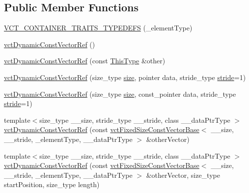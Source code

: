 \subsection*{Public Member Functions}
\begin{DoxyCompactItemize}
\item 
\hyperlink{classvct_dynamic_const_vector_ref_af5a1af086a71a1b9192b759c5d307390}{V\-C\-T\-\_\-\-C\-O\-N\-T\-A\-I\-N\-E\-R\-\_\-\-T\-R\-A\-I\-T\-S\-\_\-\-T\-Y\-P\-E\-D\-E\-F\-S} (\-\_\-element\-Type)
\item 
\hyperlink{classvct_dynamic_const_vector_ref_a6a664d6feac7f6b9ec7e6102a8752383}{vct\-Dynamic\-Const\-Vector\-Ref} ()
\item 
\hyperlink{classvct_dynamic_const_vector_ref_a9404543cc8b25da05266c6c58298cf02}{vct\-Dynamic\-Const\-Vector\-Ref} (const \hyperlink{classvct_dynamic_const_vector_ref_a8da0588e2e355e6224badfd42845195e}{This\-Type} \&other)
\item 
\hyperlink{classvct_dynamic_const_vector_ref_a15a2a61ae67187f59328e0b5af31b391}{vct\-Dynamic\-Const\-Vector\-Ref} (size\-\_\-type \hyperlink{classvct_dynamic_const_vector_base_a79950d8cced7fd4e790d9ac2ca1c43a7}{size}, pointer data, stride\-\_\-type \hyperlink{classvct_dynamic_const_vector_base_af0440ce847480b353e9f85edccc03158}{stride}=1)
\item 
\hyperlink{classvct_dynamic_const_vector_ref_aa21a63048cb504dc638afd7d3ce088cd}{vct\-Dynamic\-Const\-Vector\-Ref} (size\-\_\-type \hyperlink{classvct_dynamic_const_vector_base_a79950d8cced7fd4e790d9ac2ca1c43a7}{size}, const\-\_\-pointer data, stride\-\_\-type \hyperlink{classvct_dynamic_const_vector_base_af0440ce847480b353e9f85edccc03158}{stride}=1)
\item 
{\footnotesize template$<$size\-\_\-type \-\_\-\-\_\-size, stride\-\_\-type \-\_\-\-\_\-stride, class \-\_\-\-\_\-data\-Ptr\-Type $>$ }\\\hyperlink{classvct_dynamic_const_vector_ref_a21ce50c5b6432902022f1db81cf58c45}{vct\-Dynamic\-Const\-Vector\-Ref} (const \hyperlink{classvct_fixed_size_const_vector_base}{vct\-Fixed\-Size\-Const\-Vector\-Base}$<$ \-\_\-\-\_\-size, \-\_\-\-\_\-stride, \-\_\-element\-Type, \-\_\-\-\_\-data\-Ptr\-Type $>$ \&other\-Vector)
\item 
{\footnotesize template$<$size\-\_\-type \-\_\-\-\_\-size, stride\-\_\-type \-\_\-\-\_\-stride, class \-\_\-\-\_\-data\-Ptr\-Type $>$ }\\\hyperlink{classvct_dynamic_const_vector_ref_a6ee034fdbf22c6fd16e92dc26f393d81}{vct\-Dynamic\-Const\-Vector\-Ref} (const \hyperlink{classvct_fixed_size_const_vector_base}{vct\-Fixed\-Size\-Const\-Vector\-Base}$<$ \-\_\-\-\_\-size, \-\_\-\-\_\-stride, \-\_\-element\-Type, \-\_\-\-\_\-data\-Ptr\-Type $>$ \&other\-Vector, size\-\_\-type start\-Position, size\-\_\-type length)

\end{DoxyCompactItemize}

